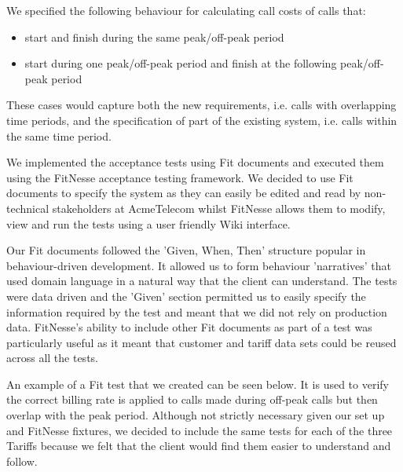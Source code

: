 \documentclass[a4paper,11pt]{article}
\begin{document}
We specified the following behaviour for calculating call costs of calls that:
\begin{itemize}
\item start and finish during the same peak/off-peak period
\item start during one peak/off-peak period and finish at the following peak/off-peak period
\end{itemize}
These cases would capture both the new requirements, i.e. calls with overlapping time periods, and the specification of part of the existing system, i.e. calls within the same time period.

We implemented the acceptance tests using Fit documents and executed them using the FitNesse acceptance testing framework. We decided to use Fit documents to specify the system as they can easily be edited and read by non-technical stakeholders at AcmeTelecom whilst FitNesse allows them to modify, view and run the tests using a user friendly Wiki interface. 

Our Fit documents followed the 'Given, When, Then' structure popular in behaviour-driven development. It allowed us to form behaviour 'narratives' that used domain language in a natural way that the client can understand. The tests were data driven and the 'Given' section permitted us to easily specify the information required by the test and meant that we did not rely on production data. FitNesse's ability to include other Fit documents as part of a test was particularly useful as it meant that customer and tariff data sets could be reused across all the tests.

An example of a Fit test that we created can be seen below. It is used to verify the correct billing rate is applied to calls made during off-peak calls but then overlap with the peak period. Although not strictly necessary given our set up and FitNesse fixtures, we decided to include the same tests for each of the three Tariffs because we felt that the client would find them easier to understand and follow.
\end{document}
